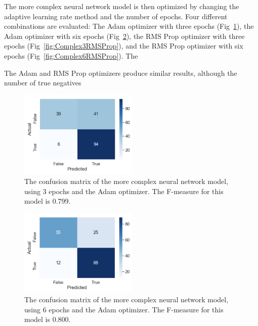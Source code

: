 The more complex neural network model is then optimized by changing the adaptive learning rate method and the number of epochs. Four different combinations are evaluated: The Adam optimizer with three epochs (Fig~\ref{fig:Complex3Adam}), the Adam optimizer with six epochs (Fig~\ref{fig:Complex6Adam}), the RMS Prop optimizer with three epochs (Fig~\ref{fig:Complex3RMSProp}), and the RMS Prop optimizer with six epochs (Fig~\ref{fig:Complex6RMSProp}). The 

The Adam and RMS Prop optimizers produce similar results, although the number of true negatives 

\begin{figure}[htbp]
  \centering
    \includegraphics[width=0.5\textwidth]{figures/Complex3Adam.pdf}
    \caption{
    	The confusion matrix of the more complex neural network model, using 3 epochs and the Adam optimizer. The F-measure for this model is 0.799.
    	}
\label{fig:Complex3Adam}
\end{figure}

\begin{figure}[htbp]
  \centering
    \includegraphics[width=0.5\textwidth]{figures/Complex6Adam.pdf}
    \caption{
    	The confusion matrix of the more complex neural network model, using 6 epochs and the Adam optimizer. The F-measure for this model is 0.800.
    	}
\label{fig:Complex6Adam}
\end{figure}

